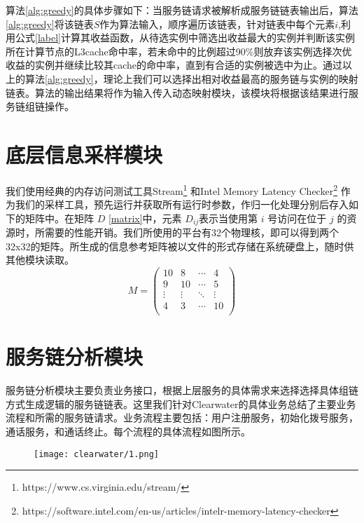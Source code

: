 算法\ref{alg:greedy}的具体步骤如下：当服务链请求被解析成服务链链表输出后，算法\ref{alg:greedy}将该链表$S$作为算法输入，顺序遍历该链表，针对链表中每个元素$i$,利用公式\ref{label}计算其收益函数，从待选实例中筛选出收益最大的实例并判断该实例所在计算节点的L3cache命中率，若未命中的比例超过90\%则放弃该实例选择次优收益的实例并继续比较其cache的命中率，直到有合适的实例被选中为止。通过以上的算法\ref{alg:greedy}，理论上我们可以选择出相对收益最高的服务链与实例的映射链表。算法的输出结果将作为输入传入动态映射模块，该模块将根据该结果进行服务链组链操作。


\section{底层信息采样模块}
我们使用经典的内存访问测试工具Stream\footnote{https://www.cs.virginia.edu/stream/} 和Intel Memory Latency Checker\footnote{https://software.intel.com/en-us/articles/intelr-memory-latency-checker} 作为我们的采样工具，预先运行并获取所有运行时参数，作归一化处理分别后存入如下的矩阵中。在矩阵 $D$ \ref{matrix}中，元素 $D_{ij}$表示当使用第 $i$ 号访问在位于 $j$ 的资源时，所需要的性能开销。我们所使用的平台有32个物理核，即可以得到两个32x32的矩阵。所生成的信息参考矩阵被以文件的形式存储在系统硬盘上，随时供其他模块读取。
$$
M =
\begin{pmatrix}
\label{matrix}
10      & 8      & \cdots & 4      \\
9      & 10      & \cdots & 5      \\
\vdots & \vdots & \ddots & \vdots \\
4      & 3      & \cdots & 10     \\
\end{pmatrix}
$$


\section{服务链分析模块}
服务链分析模块主要负责业务接口，根据上层服务的具体需求来选择选择具体组链方式生成逻辑的服务链链表。这里我们针对Clearwater的具体业务总结了主要业务流程和所需的服务链请求。业务流程主要包括：用户注册服务，初始化拨号服务，通话服务，和通话终止。每个流程的具体流程如图所示。
\begin{figure}[!htp]
	\centering
	\label{fig:flow_register}
	\texttt{[image: clearwater/1.png]}
\end{figure}

